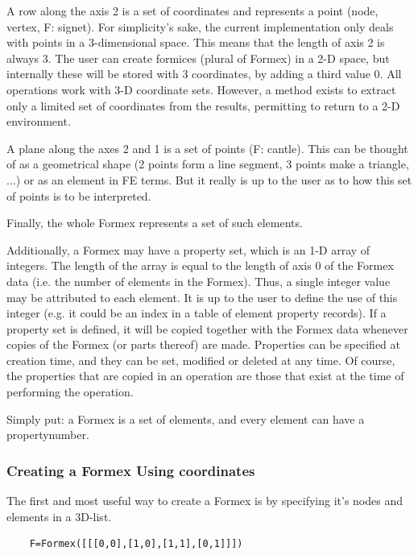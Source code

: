 \documentclass[a4paper]{manual}
\begin{document}
{    A row along the axis 2 is a set of coordinates and represents a point
    (node, vertex, F: signet).
    For simplicity's sake, the current implementation only deals with points
    in a 3-dimensional space. This means that the length of axis 2 is always 3.
    The user can create formices (plural of Formex) in a 2-D space, but
    internally these will be stored with 3 coordinates, by adding a third
    value 0. All operations work with 3-D coordinate sets. However, a method
    exists to extract only a limited set of coordinates from the results,
    permitting to return to a 2-D environment.

    A plane along the axes 2 and 1 is a set of points (F: cantle). This can be
    thought of as a geometrical shape (2 points form a line segment, 3 points
    make a triangle, ...) or as an element in FE terms. But it really is up to
    the user as to how this set of points is to be interpreted.

    Finally, the whole Formex represents a set of such elements.

    Additionally, a Formex may have a property set, which is an 1-D array of
    integers. The length of the array is equal to the length of axis 0 of the
    Formex data (i.e. the number of elements in the Formex). Thus, a single
    integer value may be attributed to each element. It is up to the user to
    define the use of this integer (e.g. it could be an index in a table of
    element property records).
    If a property set is defined, it will be copied together with the Formex
    data whenever copies of the Formex (or parts thereof) are made.
    Properties can be specified at creation time, and they can be set,
    modified or deleted at any time. Of course, the properties that are
    copied in an operation are those that exist at the time of performing
    the operation.   

Simply put: a Formex is a set of elements, and every element can have a propertynumber.


\subsubsection{Creating a Formex Using coordinates}

The first and most useful way to create a Formex is by specifying it's nodes and elements in a 3D-list.  

\begin{verbatim}
	F=Formex([[[0,0],[1,0],[1,1],[0,1]]])
\end{verbatim}

}
\end{document}
